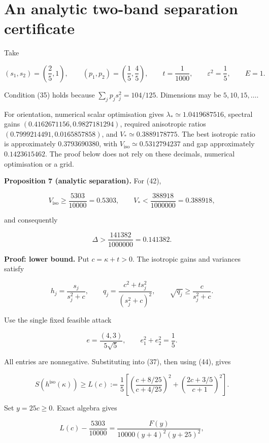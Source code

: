 \documentclass[11pt,a4paper]{article}
\begin{document}
\hypertarget{an-analytic-two-band-separation-certificate}{%
\section{An analytic two-band separation
certificate}\label{an-analytic-two-band-separation-certificate}}

Take

\[
(s_1,s_2)=\left(\frac25,1\right),\qquad
(p_1,p_2)=\left(\frac15,\frac45\right),\qquad
t=\frac1{1000},\qquad
\varepsilon^2=\frac15,\qquad E=1.
\tag{42}
\]

Condition (35) holds because \(\sum_jp_js_j^2=104/125\). Dimensions may
be \(5,10,15,\ldots\).

For orientation, numerical scalar optimisation gives
\(\lambda_*\simeq1.0419687516\), spectral gains
\((0.4162671156,0.9827181294)\), required anisotropic ratios
\((0.7999214491,0.0165857858)\), and \(V_*\simeq0.3889178775\). The best
isotropic ratio is approximately \(0.3793690380\), with
\(V_{\mathrm{iso}}\simeq0.5312794237\) and gap approximately
\(0.1423615462\). The proof below does not rely on these decimals,
numerical optimisation or a grid.

\textbf{Proposition 7 (analytic separation).} For (42),

\[
V_{\mathrm{iso}}\ge\frac{5303}{10000}=0.5303,\qquad
V_*<\frac{388918}{1000000}=0.388918,
\]

and consequently

\[
\Delta>\frac{141382}{1000000}=0.141382.
\tag{43}
\]

\textbf{Proof: lower bound.} Put \(c=\kappa+t>0\). The isotropic gains
and variances satisfy

\[
h_j=\frac{s_j}{s_j^2+c},\qquad
q_j=\frac{c^2+t s_j^2}{(s_j^2+c)^2},
\qquad
\sqrt{q_j}\ge\frac{c}{s_j^2+c}.
\tag{44}
\]

Use the single fixed feasible attack

\[
e=\frac{(4,3)}{5\sqrt5},\qquad
e_1^2+e_2^2=\frac15.
\]

All entries are nonnegative. Substituting into (37), then using (44),
gives

\[
S(h^{\mathrm{iso}}(\kappa))\ge L(c)
:=\frac15\left[
\left(\frac{c+8/25}{c+4/25}\right)^2+
\left(\frac{2c+3/5}{c+1}\right)^2
\right].
\tag{45}
\]

Set \(y=25c\ge0\). Exact algebra gives

\[
L(c)-\frac{5303}{10000}
=\frac{F(y)}{10000(y+4)^2(y+25)^2},
\tag{46}
\]
\end{document}
